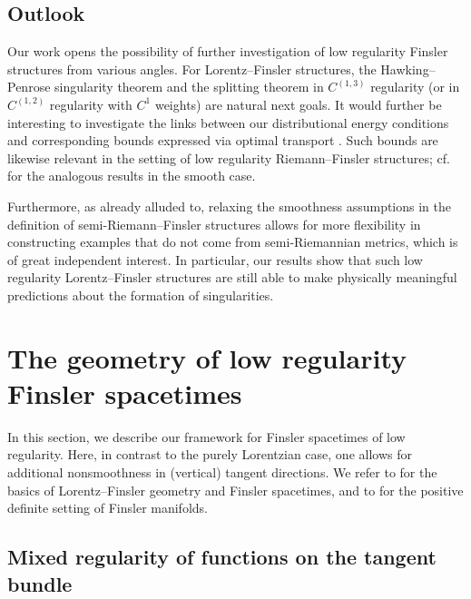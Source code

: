\documentclass[a4paper,11pt]{article}
\numberwithin{equation}{section}
\theoremstyle{definition}
\theoremstyle{plain}
\begin{document}
\subsection{Outlook}

Our work opens the possibility of further investigation of low regularity Finsler structures from various angles. 
For Lorentz--Finsler structures, the Hawking--Penrose singularity theorem \cite{KOSS} and the splitting theorem \cite{quintetnonsmooth} in $C^{(1,3)}$ regularity (or in $C^{(1,2)}$ regularity with $C^1$ weights) are natural next goals. 
It would further be interesting to investigate the links between our distributional energy conditions and corresponding bounds expressed via optimal transport \cite{BraunCalisti, braunsalamocandal}. 
Such bounds are likewise relevant in the setting of low regularity Riemann--Finsler structures; cf.\ \cite{OhtaMCP, OhtaCD} for the analogous results in the smooth case.

Furthermore, as already alluded to, relaxing the smoothness assumptions in the definition of semi-Riemann--Finsler structures allows for more flexibility in constructing examples that do not come from semi-Riemannian metrics, which is of great independent interest.
In particular, our results show that such low regularity Lorentz--Finsler structures are still able to make physically meaningful predictions about the formation of singularities.



\section{The geometry of low 
regularity Finsler spacetimes}%

In this section, we describe our framework for Finsler spacetimes of low regularity.
Here, in contrast to the purely Lorentzian case, one allows for additional nonsmoothness in (vertical) tangent directions.
We refer to \cite{MinguzziRaychaudhuri,LuMinguzziOhtaSingularity} for the basics of Lorentz--Finsler geometry and Finsler spacetimes, and to \cite{BCS,Shlec,Ohta2021} for the positive definite setting of Finsler manifolds.


\subsection{Mixed regularity of functions on the tangent bundle}%
\label{subsection: mixed regularity of maps}
\end{document}
